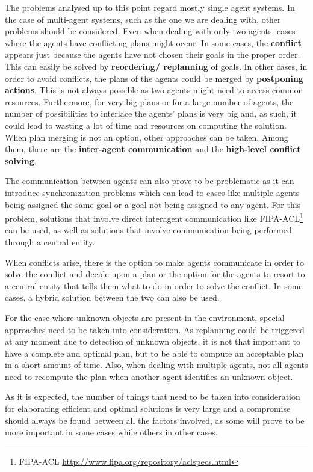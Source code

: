 The problems analysed up to this point regard mostly single agent systems. In the case of multi-agent systems,
such as the one we are dealing with, other problems should be considered. Even when dealing with only two
agents, cases where the agents have conflicting plans might occur. In some cases, the \textbf{conflict}
appears just because the agents have not chosen their goals in the proper order. This can easily be solved by
\textbf{reordering/ replanning} of goals. In other cases, in order to avoid conflicts, the plans of the agents
could be merged by \textbf{postponing actions}. This is not always possible as two agents might need to access
common resources. Furthermore, for very big plans or for a large number of agents, the number of possibilities
to interlace the agents’ plans is very big and, as such, it could lead to wasting a lot of time and resources
on computing the solution. When plan merging is not an option, other approaches can be taken. Among them,
there are the \textbf{inter-agent communication} and the \textbf{high-level conflict solving}.

The communication between agents can also prove to be problematic as it can introduce synchronization problems
which can lead to cases like multiple agents being assigned the same goal or a goal not being assigned to any
agent. For this problem, solutions that involve direct interagent communication like
FIPA-ACL\footnote{FIPA-ACL \url{http://www.fipa.org/repository/aclspecs.html}}  can be used, as well as
solutions that involve communication being performed through a central entity.

When conflicts arise, there is the option to make agents communicate in order to solve the conflict and decide
upon a plan or the option for the agents to resort to a central entity that tells them what to do in order to
solve the conflict. In some cases, a hybrid solution between the two can also be used.

For the case where unknown objects are present in the environment, special approaches need to be taken into
consideration. As replanning could be triggered at any moment due to detection of unknown objects, it is not
that important to have a complete and optimal plan, but to be able to compute an acceptable plan in a short
amount of time. Also, when dealing with multiple agents, not all agents need to recompute the plan when
another agent identifies an unknown object.

As it is expected, the number of things that need to be taken into consideration for elaborating efficient and
optimal solutions is very large and a compromise should always be found between all the factors involved, as
some will prove to be more important in some cases while others in other cases.


